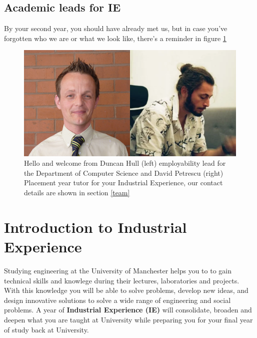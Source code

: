 \documentclass[
]{book}
\begin{document}
\section{Academic leads for IE}\label{leads}

By your second year, you should have already met us, but in case you've forgotten who we are or what we look like, there's a reminder in figure \ref{fig:team-fig}

\begin{figure}

{\centering \includegraphics[width=0.9\linewidth]{images/duncananddavid} 

}

\caption{Hello and welcome from Duncan Hull (left) employability lead for the Department of Computer Science and David Petrescu (right) Placement year tutor for your Industrial Experience, our contact details are shown in section \ref{team}}\label{fig:team-fig}
\end{figure}



\chapter{Introduction to Industrial Experience}\label{intro}

Studying engineering at the University of Manchester helps you to to gain technical skills and knowlege during their lectures, laboratories and projects. With this knowledge you will be able to solve problems, develop new ideas, and design innovative solutions to solve a wide range of engineering and social problems. A year of \textbf{Industrial Experience (IE)} will consolidate, broaden and deepen what you are taught at University while preparing you for your final year of study back at University.
\end{document}

